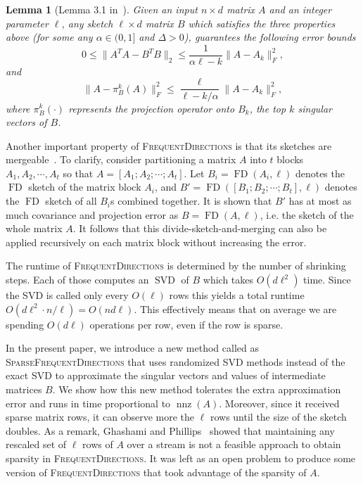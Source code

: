 \documentclass[11pt]{article}
\newcommand{\svd}{\operatorname{SVD}}
\newcommand{\nnz}{\operatorname{nnz}}
\newcommand{\FD}{\operatorname{FD}}
\newcommand{\fd}{\textsc{FrequentDirections}\xspace}
\newcommand{\sfd}{\textsc{SparseFrequentDirections}\xspace}
\newtheorem{lemma}{Lemma}[section]
\begin{document}
\begin{lemma}[Lemma 3.1 in~\cite{desai2015improved}]\label{lem:desai}
Given an input $n \times d$ matrix $A$ and an integer parameter $\ell$, any sketch $\ell \times d$ matrix $B$ which satisfies the three properties above (for some any $\alpha \in (0,1]$ and $\Delta > 0$),
guarantees the following error bounds
\[
0 \leq \|A^T A - B^T B\|_2 \leq \frac{1}{\alpha \ell-k} \|A -A_k\|_F^2, 
\]
and
\[
\|A - \pi_{B}^k(A)\|_F^2 \leq \frac{\ell}{ \ell -k/\alpha} \|A - A_k\|_F^2, 
\]
where $\pi^k_{B}(\cdot)$ represents the projection operator onto $B_k$, the top $k$ singular vectors of $B$.  
\end{lemma}

Another important property of \fd is that its sketches are mergeable~\cite{ghashami2015frequent}. To clarify, consider partitioning a matrix $A$ into $t$ blocks $A_1, A_2, \cdots, A_t$ so that $A = [A_1; A_2; \cdots; A_t]$. Let $B_i = \FD(A_i, \ell)$ denotes the $\FD$ sketch of the matrix block $A_i$, and $B' = \FD ([B_1; B_2; \cdots; B_t], \ell)$ denotes the $\FD$ sketch of all $B_i$s combined together.
It is shown that $B'$ has at most as much covariance and projection error as $B = \FD(A, \ell)$, i.e. the sketch of the whole matrix $A$. It follows that this divide-sketch-and-merging can also be applied recursively on each matrix block without increasing the error.



The runtime of \fd is determined by the number of shrinking steps. 
Each of those computes an $\svd$ of $B$ which takes $O(d\ell^2)$ time. 
Since the SVD is called only every $O(\ell)$ rows this yields a total runtime $O(d\ell^2 \cdot n/\ell) = O(nd\ell)$. This effectively means that on average we are spending $O(d\ell)$ operations per row, even if the row is sparse. 

In the present paper, we introduce a new method called as \sfd that uses randomized SVD methods instead of the exact SVD to approximate the singular vectors and values of intermediate matrices $B$.  We show how this new method tolerates the extra approximation error and runs in time proportional to $\nnz(A)$. Moreover, since it received sparse matrix rows, it can observe more the $\ell$ rows until the size of the sketch doubles.
As a remark, Ghashami and Phillips~\cite{ghashami2014relative} showed that maintaining any rescaled set of $\ell$ rows of $A$ over a stream is not a feasible approach to obtain sparsity in \fd. It was left as an open problem to produce some version of \fd that took advantage of the sparsity of $A$.  
\end{document}
